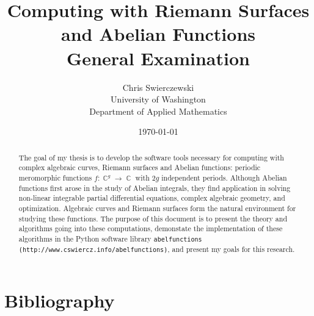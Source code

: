 \documentclass[10pt,twoside]{article}
\title{Computing with Riemann Surfaces and Abelian Functions \\ {\small
    General Examination}}
\author{
Chris Swierczewski\\
University of Washington\\
Department of Applied Mathematics}
\date{\today}
\theoremstyle{plain}
\theoremstyle{definition}
\numberwithin{equation}{section}
\numberwithin{figure}{section}
\DeclareMathOperator{\CC}{\mathbb{C}}
\begin{document}

\maketitle

\begin{abstract}
The goal of my thesis is to develop the software tools necessary for
computing with complex algebraic curves, Riemann surfaces and Abelian
functions: periodic meromorphic functions $f : \CC^g \to \CC$ with $2g$
independent periods. Although Abelian functions first arose in the study
of Abelian integrals, they find application in solving non-linear
integrable partial differential equations, complex algebraic geometry,
and optimization. Algebraic curves and Riemann surfaces form the natural
environment for studying these functions. The purpose of this document
is to present the theory and algorithms going into these computations,
demonstate the implementation of these algorithms in the Python software
library {\tt abelfunctions (http://www.cswiercz.info/abelfunctions)},
and present my goals for this research.
\end{abstract}

%
%
%


\section{Bibliography}






\end{document}
